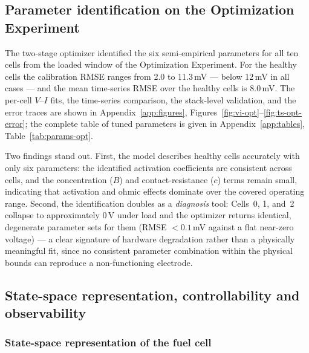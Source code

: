 \documentclass[11pt,a4paper]{article}
\begin{document}
\subsection{Parameter identification on the Optimization Experiment}
\label{sec:results-identification}

The two-stage optimizer identified the six semi-empirical parameters for all ten
cells from the loaded window of the Optimization Experiment. For the healthy cells
the calibration RMSE ranges from 2.0 to 11.3\,mV --- below 12\,mV in all cases ---
and the mean time-series RMSE over the healthy cells is 8.0\,mV. The per-cell
$V$--$I$ fits, the time-series comparison, the stack-level validation, and the
error traces are shown in Appendix~\ref{app:figures},
Figures~\ref{fig:vi-opt}--\ref{fig:ts-opt-error}; the complete table of tuned
parameters is given in Appendix~\ref{app:tables}, Table~\ref{tab:params-opt}.

Two findings stand out. First, the model describes healthy cells accurately with
only six parameters: the identified activation coefficients are consistent across
cells, and the concentration ($B$) and contact-resistance ($c$) terms remain
small, indicating that activation and ohmic effects dominate over the covered
operating range. Second, the identification doubles as a \emph{diagnosis} tool:
Cells~0, 1, and~2 collapse to approximately 0\,V under load and the optimizer
returns identical, degenerate parameter sets for them (RMSE $<0.1$\,mV against a
flat near-zero voltage) --- a clear signature of hardware degradation rather than
a physically meaningful fit, since no consistent parameter combination within the
physical bounds can reproduce a non-functioning electrode.

\subsection{State-space representation, controllability and observability}
\label{sec:ctrb-obsv}

\subsubsection{State-space representation of the fuel cell}
\end{document}
